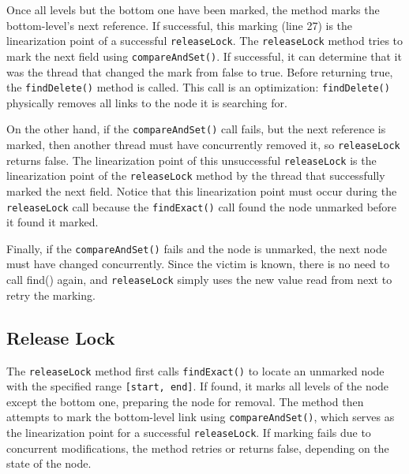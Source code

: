 Once all levels but the bottom one have been marked, the method marks the bottom-level's next reference. If successful, this marking (line 27) is the linearization point of a successful \texttt{releaseLock}. The \texttt{releaseLock} method tries to mark the next field using \texttt{compareAndSet()}. If successful, it can determine that it was the thread that changed the mark from false to true. Before returning true, the \texttt{findDelete()} method is called. This call is an optimization: \texttt{findDelete()} physically removes all links to the node it is searching for.

On the other hand, if the  \texttt{compareAndSet()} call fails, but the next reference is marked, then another thread must have concurrently removed it, so \texttt{releaseLock} returns false. The linearization point of this unsuccessful \texttt{releaseLock} is the linearization point of the \texttt{releaseLock} method by the thread that successfully marked the next field. Notice that this linearization point must occur during the \texttt{releaseLock} call because the \texttt{findExact()} call found the node unmarked before it found it marked.

Finally, if the \texttt{compareAndSet()} fails and the node is unmarked, the next node must have changed concurrently. Since the victim is known, there is no need to call find() again, and \texttt{releaseLock} simply uses the new value read from next to retry the marking.

\clearpage

\subsection{Release Lock}\label{subsec:releaseLock}

The \texttt{releaseLock} method first calls \texttt{findExact()} to locate an unmarked node with the specified range \texttt{[start, end]}. If found, it marks all levels of the node except the bottom one, preparing the node for removal. The method then attempts to mark the bottom-level link using \texttt{compareAndSet()}, which serves as the linearization point for a successful \texttt{releaseLock}. If marking fails due to concurrent modifications, the method retries or returns false, depending on the state of the node.

\vspace{15pt}

\begin{figure}[!p]
    \centering
    
\end{figure}

